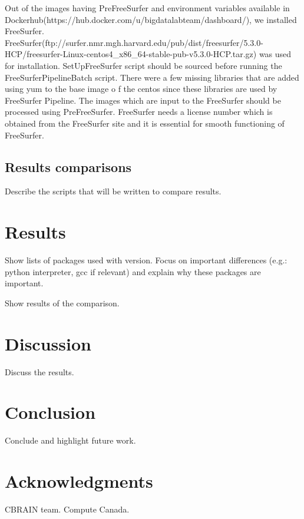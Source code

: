 \documentclass{article}
\begin{document}
Out of the images having PreFreeSurfer and environment variables available in Dockerhub(https://hub.docker.com/u/bigdatalabteam/dashboard/), we installed FreeSurfer. FreeSurfer(ftp://surfer.nmr.mgh.harvard.edu/pub/dist/freesurfer/5.3.0-HCP/freesurfer-Linux-centos4\_x86\_64-stable-pub-v5.3.0-HCP.tar.gz) was used for installation. SetUpFreeSurfer script should be sourced before running the FreeSurferPipelineBatch script. There were a few missing libraries that are added using yum to the base image o f the centos since these libraries are used by FreeSurfer Pipeline. The images which are input to the FreeSurfer should be processed using PreFreeSurfer. FreeSurfer needs a license number which is obtained from the FreeSurfer site and it is essential for smooth functioning of FreeSurfer. 

\subsection{Results comparisons}

Describe the scripts that will be written to compare results.

\section{Results}

Show lists of packages used with version. Focus on important
differences (e.g.: python interpreter, gcc if relevant) and explain
why these packages are important.

Show results of the comparison.

\section{Discussion}

Discuss the results.

\section{Conclusion}

Conclude and highlight future work.

\section{Acknowledgments}

CBRAIN team. Compute Canada.



\end{document}

